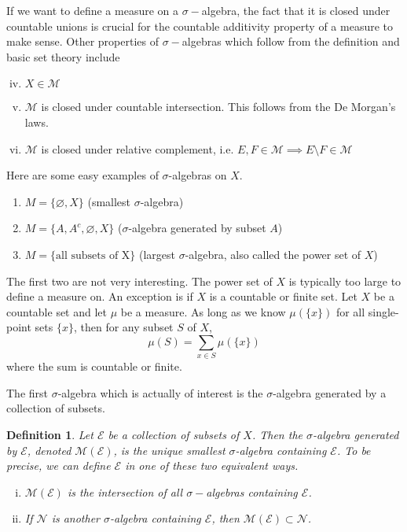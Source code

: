 \documentclass[10pt]{article}         %
\newtheorem{definition}{Definition}[section]
\theoremstyle{remark}
\begin{document}
If we want to define a measure on a $\sigma-$algebra, the fact that it is closed under countable unions is crucial for the countable additivity property of a measure to make sense. Other properties of $\sigma-$algebras which follow from the definition and basic set theory include
\begin{enumerate}[(i)]\setcounter{enumi}{3}
	\item $X \in \mathcal{M}$ 
	\item $\mathcal{M}$ is closed under countable intersection. This follows from the De Morgan's laws.
	\item $\mathcal{M}$ is closed under relative complement, i.e. $E, F \in \mathcal{M} \implies E \setminus F \in \mathcal{M}$
\end{enumerate}

Here are some easy examples of $\sigma$-algebras on $X$.
\begin{enumerate}
    \item $M = \{ \varnothing, X \}$ (smallest $\sigma$-algebra)
    \item $M = \{ A, A^c, \varnothing, X\}$ ($\sigma$-algebra generated by subset $A$)
    \item $M = \{ \text{all subsets of X} \}$ (largest $\sigma$-algebra, also called the power set of $X$)
\end{enumerate}

The first two are not very interesting. The power set of $X$ is typically too large to define a measure on. An exception is if $X$ is a countable or finite set. Let $X$ be a countable set and let $\mu$ be a measure. As long as we know $\mu(\{x\})$ for all single-point sets $\{x\}$, then for any subset $S$ of $X$,
\[
\mu(S) = \sum_{x \in S} \mu(\{x\})
\]
where the sum is countable or finite.

The first $\sigma$-algebra which is actually of interest is the $\sigma$-algebra generated by a collection of subsets.

\begin{definition}Let $\mathcal{E}$ be a collection of subsets of $X$. Then the \emph{$\sigma$-algebra generated by $\mathcal{E}$}, denoted $\mathcal{M}(\mathcal{E})$, is the unique smallest $\sigma$-algebra containing $\mathcal{E}$. To be precise, we can define $\mathcal{E}$ in one of these two equivalent ways.
\begin{enumerate}[(i)]
\item $\mathcal{M}(\mathcal{E})$ is the intersection of all $\sigma-$algebras containing $\mathcal{E}$.
\item If $\mathcal{N}$ is another $\sigma$-algebra containing $\mathcal{E}$, then $\mathcal{M}(\mathcal{E}) \subset \mathcal{N}$.
\end{enumerate}
\end{definition}
\end{document}
